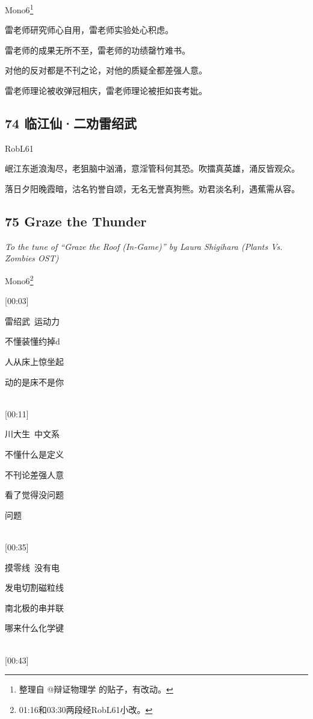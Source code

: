 Mono6\footnote{整理自 @辩证物理学 的贴子，有改动。}

雷老师研究师心自用，雷老师实验处心积虑。

雷老师的成果无所不至，雷老师的功绩罄竹难书。

对他的反对都是不刊之论，对他的质疑全都差强人意。

雷老师理论被收弹冠相庆，雷老师理论被拒如丧考妣。

\hypertarget{ux4e34ux6c5fux4ed9ux4e8cux529dux96f7ux7ecdux6b66}{%
\subsection{74
临江仙·二劝雷绍武}\label{ux4e34ux6c5fux4ed9ux4e8cux529dux96f7ux7ecdux6b66}}

RobL61

岷江东逝浪淘尽，老狙脑中汹涌，意淫管科何其恐。吹擂真英雄，涌反皆观众。

落日夕阳晚霞暗，沽名钓誉自颂，无名无誉真狗熊。劝君淡名利，遇蕉需从容。

\hypertarget{graze-the-thunder}{%
\subsection{75 Graze the Thunder}\label{graze-the-thunder}}

\emph{To the tune of ``Graze the Roof (In-Game)'' by Laura Shigihara
(Plants Vs. Zombies OST)}

Mono6\footnote{01:16和03:30两段经RobL61小改。}

{[}00:03{]}

雷绍武~运动力

不懂装懂约掉d

人从床上惊坐起

动的是床不是你

~\\
{[}00:11{]}

川大生~中文系

不懂什么是定义

不刊论差强人意

看了觉得没问题

问题

~\\
{[}00:35{]}

摸零线~没有电

发电切割磁粒线

南北极的串并联

哪来什么化学键

~\\
{[}00:43{]}

